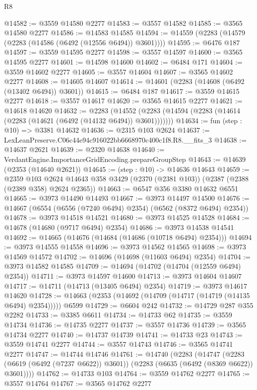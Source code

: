 \begin{lexlean}{R8}
\begin{coremodule}
@14582 := @3559 @14580 @2277
@14583 := @3557 @14582
@14585 := @3565 @14580 @2277
@14586 := @14583 @14585
@14594 := @14559 (@2283 (@14579 (@2283 (@14586 (@6492 (@12556 @6494)) @3601))))
@14595 := @6476 @187
@14597 := @3559 @14595 @2277
@14598 := @3557 @14597
@14600 := @3565 @14595 @2277
@14601 := @14598 @14600
@14602 := @6484 @171
@14604 := @3559 @14602 @2277
@14605 := @3557 @14604
@14607 := @3565 @14602 @2277
@14608 := @14605 @14607
@14614 := @14601 (@2283 (@14608 (@6492 (@13402 @6494)) @3601))
@14615 := @6484 @187
@14617 := @3559 @14615 @2277
@14618 := @3557 @14617
@14620 := @3565 @14615 @2277
@14621 := @14618 @14620
@14632 := @2283
    (@14552 (@2283 (@14594 (@2283 (@14614 (@2283 (@14621 (@6492 (@14132 @6494)) @3601)))))))
@14634 := fun (step : @10) => @3381 @14632
@14636 := @2315 @103 @2624
@14637 := LexLeanPreserve.C06c44e94c916022bb6668970c400c1f8.R8.__fits_3
@14638 := @14637 @2621
@14639 := @2320 @14638
@14640 := VerdantEngine.ImportanceGridEncoding.prepareGroupStep
@14643 := @14639 (@2353 (@14640 @2621))
@14645 := (step : @10) -> @14636 @14643
@14659 := @2359
    @103
    @2624
    @14643
    @358
    @3429
    (@2370 (@2381 @103))
    (@2387 (@2388 (@2389 @358) @2624 @2365))
@14663 := @6547 @356 @3380 @14632 @6551
@14665 := @3973 @14490 @14493
@14667 := @3973 @14497 @14500
@14676 := @14667 (@6554 (@6556 (@7240 @6494) @2354) (@6562 (@8372 @6494) @2354))
@14678 := @3973 @14518 @14521
@14680 := @3973 @14525 @14528
@14684 := @14678 (@14680 (@9717 @6494) @2354)
@14686 := @3973 @14538 @14541
@14692 := @14665 (@14676 (@14684 (@14686 (@10718 @6494) @2354)))
@14694 := @3973 @14555 @14558
@14696 := @3973 @14562 @14565
@14698 := @3973 @14569 @14572
@14702 := @14696 (@14698 (@11603 @6494) @2354)
@14704 := @3973 @14582 @14585
@14709 := @14694 (@14702 (@14704 (@12559 @6494) @2354))
@14711 := @3973 @14597 @14600
@14713 := @3973 @14604 @14607
@14717 := @14711 (@14713 (@13405 @6494) @2354)
@14719 := @3973 @14617 @14620
@14728 := @14663 (@2353 (@14692 (@14709 (@14717 (@14719 (@14135 @6494) @2354))))) @6599
@14729 := @6604 @242
@14732 := @14729 @287 @355 @2282
@14733 := @3385 @6611
@14734 := @14733 @62
@14735 := @3559 @14734
@14736 := @14735 @2277
@14737 := @3557 @14736
@14739 := @3565 @14734 @2277
@14740 := @14737 @14739
@14741 := @14733 @23
@14743 := @3559 @14741 @2277
@14744 := @3557 @14743
@14746 := @3565 @14741 @2277
@14747 := @14744 @14746
@14761 := @14740
    (@2283
      (@14747
        (@2283 (@6619 (@6492 (@7237 @6622)) @3601))
        (@2283 (@6635 (@6492 (@8369 @6622)) @3601))))
@14762 := @14733 @103
@14764 := @3559 @14762 @2277
@14765 := @3557 @14764
@14767 := @3565 @14762 @2277

\end{coremodule}
\end{lexlean}
